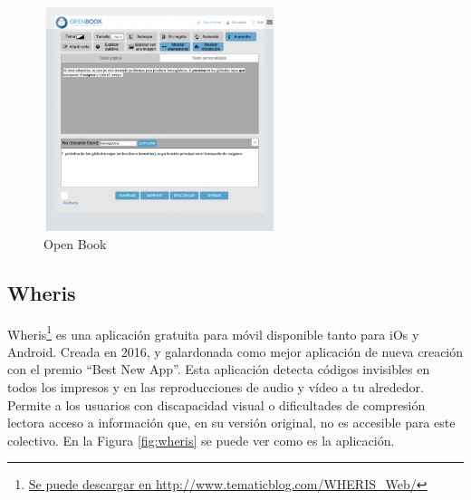 \begin{figure}[h]
	\centering
	\includegraphics[width=0.6\textwidth]{Imagenes/ProyectosMateriales/openBook}
	\caption{Open Book}
	\label{fig:openBook}
\end{figure} 

\subsection{Wheris }

Wheris\footnote{\href{http://www.tematicblog.com/WHERIS\_Web//}{Se puede descargar en http://www.tematicblog.com/WHERIS\_Web/}} es una aplicación gratuita para móvil disponible tanto para iOs y Android. Creada en 2016, y galardonada como mejor aplicación de nueva creación con el premio ``Best New App''. Esta aplicación detecta códigos invisibles en todos los impresos y en las reproducciones de audio y vídeo a tu alrededor. Permite a los usuarios con discapacidad visual o dificultades de compresión lectora acceso a información que, en su versión original, no es accesible para este colectivo. En la Figura \ref{fig:wheris} se puede ver como es la aplicación.



